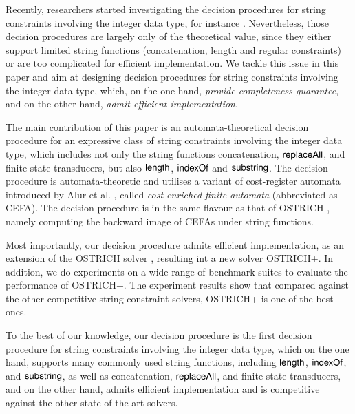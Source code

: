 
Recently, researchers started investigating the decision procedures for string constraints involving the integer data type, for instance \cite{Vijay-length,L16,LinM18,LB16}. Nevertheless, those decision procedures are largely only of the theoretical value, since they either support limited string functions (concatenation, length and regular constraints) or are too complicated for efficient implementation. We tackle this issue in this paper and aim at designing decision procedures for string constraints involving the integer data type, which, on the one hand, \emph{provide completeness guarantee}, and on the other hand, \emph{admit efficient implementation}.

The main contribution of this paper is an automata-theoretical decision procedure for an expressive class of string constraints involving the integer data type, which includes not only the string functions concatenation, $\mathsf{replaceAll}$, and finite-state transducers, but also $\mathsf{length}$, $\mathsf{indexOf}$ and $\mathsf{substring}$. The decision procedure is automata-theoretic and utilises a variant of cost-register automata introduced by Alur et al. \cite{RLJ+13}, called \emph{cost-enriched finite automata} (abbreviated as CEFA). The decision procedure is in the same flavour as that of OSTRICH \cite{CHL+19}, namely computing the backward image of CEFAs under string functions. 

Most importantly, our decision procedure admits efficient implementation, as an extension of the OSTRICH solver \cite{CHL+19}, resulting int a new solver OSTRICH+.  In addition, we do experiments on a wide range of benchmark suites to evaluate the performance of OSTRICH+. The experiment results show that compared against the other competitive string constraint solvers, OSTRICH+ is one of the best ones. 

To the best of our knowledge, our decision procedure is the first decision procedure for string constraints involving the integer data type, which on the one hand, supports many commonly used string functions, including $\mathsf{length}$, $\mathsf{indexOf}$, and $\mathsf{substring}$,  as well as concatenation, $\mathsf{replaceAll}$, and finite-state transducers, and on the other hand, admits efficient implementation and is competitive against the other state-of-the-art solvers.



